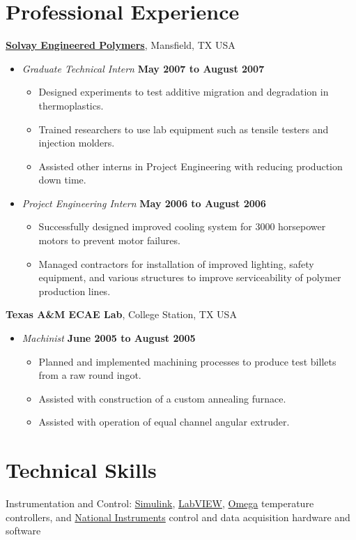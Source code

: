 \documentclass[line,margin]{res}
\begin{document}
\begin{resume}
\section{Professional Experience}
% 
\href{http://www.lyondellbasell.com/LandingPages/SolvayEngineeredPolymers}{\textbf{Solvay
    Engineered Polymers}}, Mansfield, TX USA 
\begin{itemize}
\item \textit{Graduate Technical Intern}%
  \hfill \textbf{May 2007 to August 2007}
  \begin{itemize}
  \item Designed experiments to test additive migration
    and degradation in thermoplastics.
  \item Trained researchers to use lab equipment such as tensile
    testers and injection molders.
  \item Assisted other interns in Project Engineering with
    reducing production down time.
  \end{itemize}
\item \textit{Project Engineering Intern}%
  \hfill \textbf{May 2006 to August 2006}
  \begin{itemize}
  \item Successfully designed improved cooling system for 3000
    horsepower motors to prevent motor failures.
  \item Managed contractors for installation of improved lighting,
    safety equipment, and various structures to improve serviceability
    of polymer production lines.
  \end{itemize}
\end{itemize}

\textbf{Texas A\&M ECAE Lab}, College Station, TX USA
\begin{itemize}
\item \textit{Machinist}%
  \hfill \textbf{June 2005 to August 2005}
  \begin{itemize}
  \item Planned and implemented machining processes to produce test
    billets from a raw round ingot.
  \item Assisted with construction of a custom annealing furnace.
  \item Assisted with operation of equal channel angular extruder.
  \end{itemize}
\end{itemize}

\section{Technical Skills}
% 
Instrumentation and Control:
\href{http://www.mathworks.com/products/simulink/}{Simulink},
\href{http://www.ni.com/}{LabVIEW}, 
\href{http://www.omega.com/}{Omega} temperature controllers,
and
\href{http://www.ni.com}{National Instruments}
control and data acquisition hardware and software




\end{resume}
\end{document}
